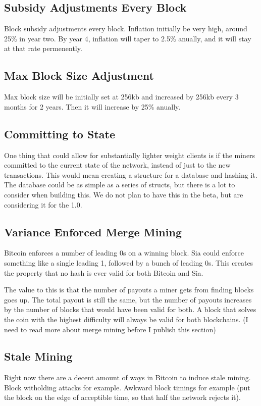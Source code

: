 \documentclass[twocolumn]{article}
\begin{document}
\subsection{Subsidy Adjustments Every Block}
Block subsidy adjustments every block.
Inflation initially be very high, around 25\% in year two.
By year 4, inflation will taper to 2.5\% anually, and it will stay at that rate permenently.

\subsection{Max Block Size Adjustment}
Max block size will be initially set at 256kb and increased by 256kb every 3 months for 2 years.
Then it will increase by 25\% anually.

\subsection{Committing to State}
One thing that could allow for substantially lighter weight clients is if the miners committed to the current state of the network, instead of just to the new transactions.
This would mean creating a structure for a database and hashing it.
The database could be as simple as a series of structs, but there is a lot to consider when building this.
We do not plan to have this in the beta, but are considering it for the 1.0.

\subsection{Variance Enforced Merge Mining}
Bitcoin enforces a number of leading 0s on a winning block.
Sia could enforce something like a single leading 1, followed by a bunch of leading 0s.
This creates the property that no hash is ever valid for both Bitcoin and Sia.

The value to this is that the number of payouts a miner gets from finding blocks goes up.
The total payout is still the same, but the number of payouts increases by the number of blocks that would have been valid for both.
A block that solves the coin with the highest difficulty will always be valid for both blockchains.
(I need to read more about merge mining before I publish this section)

\subsection{Stale Mining}
Right now there are a decent amount of ways in Bitcoin to induce stale mining.
Block witholding attacks for example.
Awkward block timings for example (put the block on the edge of acceptible time, so that half the network rejects it).
\end{document}

